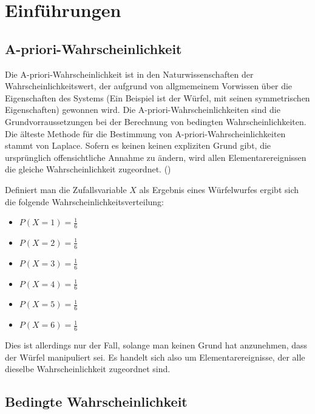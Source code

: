 
\chapter{Einführungen}

\section{A-priori-Wahrscheinlichkeit}

Die A-priori-Wahrscheinlichkeit ist in den Naturwissenschaften der Wahrscheinlichkeitswert, der aufgrund von allgmemeinem Vorwissen über die Eigenschaften des Systems
(Ein Beispiel ist der Würfel, mit seinen symmetrischen Eigenschaften) gewonnen wird. Die A-priori-Wahrscheinlichkeiten sind die Grundvorraussetzungen
bei der Berechnung von bedingten Wahrscheinlichkeiten.
Die älteste Methode für die Bestimmung von A-priori-Wahrscheinlichkeiten stammt von Laplace. Sofern es keinen keinen expliziten Grund gibt, die ursprünglich
offensichtliche Annahme zu ändern, wird allen Elementarereignissen die gleiche Wahrscheinlichkeit zugeordnet. (\cite[S. 80f]{Pap:1995})

Definiert man die Zufallsvariable $X$ als Ergebnis eines Würfelwurfes ergibt sich die folgende Wahrscheinlichkeitsverteilung:

\begin{multicols}{3}
    \begin{itemize}
        \item $P(X = 1) = \frac{1}{6}$
        \item $P(X = 2) = \frac{1}{6}$
        \item $P(X = 3) = \frac{1}{6}$
        \item $P(X = 4) = \frac{1}{6}$
        \item $P(X = 5) = \frac{1}{6}$
        \item $P(X = 6) = \frac{1}{6}$
    \end{itemize}
\end{multicols}

Dies ist allerdings nur der Fall, solange man keinen Grund hat anzunehmen, dass der Würfel manipuliert sei. Es handelt sich also um Elementarereignisse, der
alle dieselbe Wahrscheinlichkeit zugeordnet sind.

\section{Bedingte Wahrscheinlichkeit}

